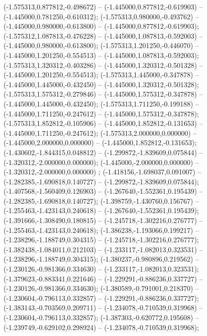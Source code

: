  (-1.575313,0.877812,-0.498672) -- (-1.445000,0.877812,-0.619903) -- (-1.445000,0.781250,-0.610312);
 (-1.575313,0.980000,-0.493762) -- (-1.445000,0.980000,-0.613800) -- (-1.445000,0.877812,-0.619903);
 (-1.575312,1.087813,-0.476228) -- (-1.445000,1.087813,-0.592003) -- (-1.445000,0.980000,-0.613800);
 (-1.575313,1.201250,-0.446070) -- (-1.445000,1.201250,-0.554513) -- (-1.445000,1.087813,-0.592003);
 (-1.575313,1.320312,-0.403286) -- (-1.445000,1.320312,-0.501328) -- (-1.445000,1.201250,-0.554513);
 (-1.575313,1.445000,-0.347878) -- (-1.445000,1.445000,-0.432450) -- (-1.445000,1.320312,-0.501328);
 (-1.575313,1.575312,-0.279846) -- (-1.445000,1.575312,-0.347878) -- (-1.445000,1.445000,-0.432450);
 (-1.575313,1.711250,-0.199188) -- (-1.445000,1.711250,-0.247612) -- (-1.445000,1.575312,-0.347878);
 (-1.575313,1.852812,-0.105906) -- (-1.445000,1.852812,-0.131653) -- (-1.445000,1.711250,-0.247612);
 (-1.575313,2.000000,0.000000) -- (-1.445000,2.000000,0.000000) -- (-1.445000,1.852812,-0.131653);
 (-1.430602,-1.844315,0.048812) -- (-1.299872,-1.839609,0.075844) -- (-1.320312,-2.000000,0.000000);
 (-1.445000,-2.000000,0.000000) -- (-1.320312,-2.000000,0.000000) ;
 (-1.418156,-1.698037,0.091007) -- (-1.282385,-1.690818,0.140727) -- (-1.299872,-1.839609,0.075844);
 (-1.407568,-1.560409,0.126903) -- (-1.267640,-1.552361,0.195439) -- (-1.282385,-1.690818,0.140727);
 (-1.398759,-1.430760,0.156767) -- (-1.255463,-1.423143,0.240618) -- (-1.267640,-1.552361,0.195439);
 (-1.391666,-1.308490,0.180815) -- (-1.245718,-1.302216,0.276777) -- (-1.255463,-1.423143,0.240618);
 (-1.386238,-1.193066,0.199217) -- (-1.238296,-1.188749,0.304315) -- (-1.245718,-1.302216,0.276777);
 (-1.382438,-1.084011,0.212103) -- (-1.233117,-1.082013,0.323531) -- (-1.238296,-1.188749,0.304315);
 (-1.380237,-0.980896,0.219562) -- (-1.230126,-0.981366,0.334630) -- (-1.233117,-1.082013,0.323531);
 (-1.379623,-0.883341,0.221646) -- (-1.229291,-0.886236,0.337727) -- (-1.230126,-0.981366,0.334630);
 (-1.380589,-0.791001,0.218370) -- (-1.230604,-0.796113,0.332857) -- (-1.229291,-0.886236,0.337727);
 (-1.383143,-0.703569,0.209711) -- (-1.234078,-0.710539,0.319968) -- (-1.230604,-0.796113,0.332857);
 (-1.387303,-0.620772,0.195608) -- (-1.239749,-0.629102,0.298924) -- (-1.234078,-0.710539,0.319968);
